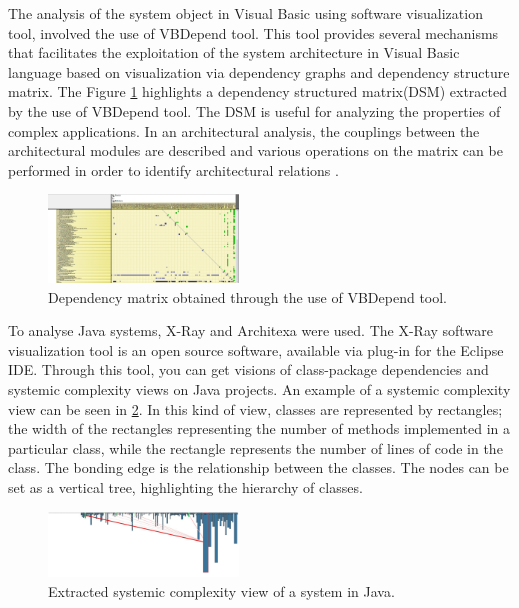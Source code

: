 \documentclass{sig-alternate-05-2015}
\begin{document}
The analysis of the system object in Visual Basic using software visualization tool, involved the use of VBDepend tool. This tool provides several mechanisms that facilitates the exploitation of the system architecture in Visual Basic language based on visualization via dependency graphs and dependency structure matrix. The Figure  \ref{matrizDependenciaVBDependend} highlights a dependency structured  matrix(DSM) extracted by the use of VBDepend tool. The DSM is useful for analyzing the properties of complex applications. In an architectural analysis, the couplings between the architectural modules are described and various operations on the matrix can be performed in order to identify architectural relations \cite{Tekinerdogan_2009}.

\begin{figure}[!h]
	\centering
	\includegraphics[width=0.45\textwidth]{6_matrizDependenciaVBDependend}
	\caption{Dependency matrix obtained through the use of VBDepend tool.}
	\label{matrizDependenciaVBDependend}
\end{figure}

To analyse Java systems,  X-Ray and Architexa were used. The X-Ray software visualization tool is an open source software, available via plug-in for the Eclipse IDE. Through this tool, you can get visions of class-package dependencies and systemic complexity views on Java projects. An example of a systemic complexity view can be seen in \ref{xray_complexidade}. In this kind of view, classes are represented by rectangles; the width of the rectangles representing the number of methods implemented in a particular class, while the rectangle represents the number of lines of code in the class. The bonding edge is the relationship between the classes. The nodes can be set as a vertical tree, highlighting the hierarchy of classes.

\begin{figure}[!h]
	\centering
	\includegraphics[width=0.45\textwidth]{6_xray_complexidade}
	\caption{Extracted systemic complexity view of a system in Java.}
	\label{xray_complexidade}
\end{figure}
\end{document}
